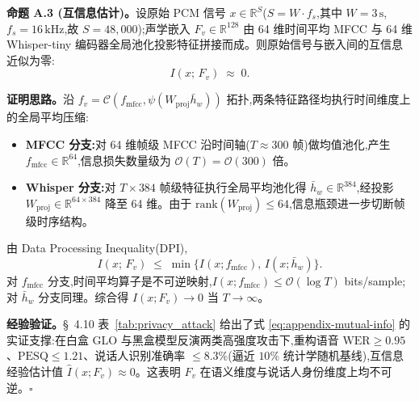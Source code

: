 \documentclass[11pt, a4paper]{article}
\begin{document}
\noindent\textbf{命题 A.3 (互信息估计)。}\quad 设原始 PCM 信号 $x\in\mathbb{R}^{S}$($S=W\cdot f_s$,其中 $W=3\,\mathrm{s}$,$f_s=16\,\mathrm{kHz}$,故 $S=48{,}000$);声学嵌入 $F_v\in\mathbb{R}^{128}$ 由 64 维时间平均 MFCC 与 64 维 Whisper-tiny 编码器全局池化投影特征拼接而成。则原始信号与嵌入间的互信息近似为零:
\begin{equation}
\label{eq:appendix-mutual-info}
I(x;\,F_v)
\;\approx\;
0.
\end{equation}

\noindent\textbf{证明思路。}\quad 沿 $f_v = \mathcal{C}(f_{\mathrm{mfcc}},\psi(W_{\mathrm{proj}}\bar h_w))$ 拓扑,两条特征路径均执行时间维度上的全局平均压缩:

\begin{itemize}
\item \textbf{MFCC 分支:}对 64 维帧级 MFCC 沿时间轴($T\approx 300$ 帧)做均值池化,产生 $f_{\mathrm{mfcc}}\in\mathbb{R}^{64}$,信息损失数量级为 $\mathcal{O}(T)=\mathcal{O}(300)$ 倍。
\item \textbf{Whisper 分支:}对 $T\times 384$ 帧级特征执行全局平均池化得 $\bar h_w\in\mathbb{R}^{384}$,经投影 $W_{\mathrm{proj}}\in\mathbb{R}^{64\times384}$ 降至 64 维。由于 $\mathrm{rank}(W_{\mathrm{proj}})\le 64$,信息瓶颈进一步切断帧级时序结构。
\end{itemize}

由 Data Processing Inequality(DPI),
\[
I(x;\,F_v)
\;\le\;
\min\!\bigl\{I(x;f_{\mathrm{mfcc}}),\,I(x;\bar h_w)\bigr\}.
\]
对 $f_{\mathrm{mfcc}}$ 分支,时间平均算子是不可逆映射,$I(x;f_{\mathrm{mfcc}})\le \mathcal{O}(\log T)$ bits/sample;对 $\bar h_w$ 分支同理。综合得 $I(x;F_v)\to 0$ 当 $T\to\infty$。

\noindent\textbf{经验验证。}\quad \S~4.10 表~\ref{tab:privacy_attack} 给出了式 \eqref{eq:appendix-mutual-info} 的实证支撑:在白盒 GLO 与黑盒模型反演两类高强度攻击下,重构语音 $\mathrm{WER}\ge 0.95$、$\mathrm{PESQ}\le 1.21$、说话人识别准确率 $\le 8.3\%$(逼近 $10\%$ 统计学随机基线),互信息经验估计值 $\hat I(x;F_v)\approx 0$。这表明 $F_v$ 在语义维度与说话人身份维度上均不可逆。\hfill$\square$


\newpage

\printbibliography
\end{document}
